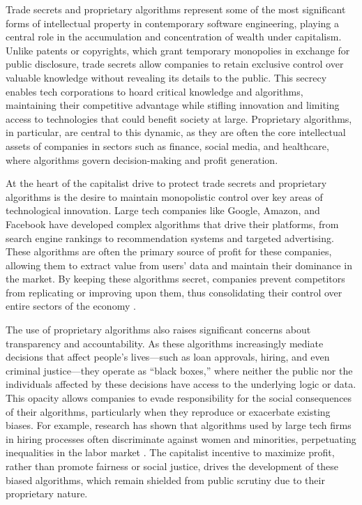 Trade secrets and proprietary algorithms represent some of the most significant forms of intellectual property in contemporary software engineering, playing a central role in the accumulation and concentration of wealth under capitalism. Unlike patents or copyrights, which grant temporary monopolies in exchange for public disclosure, trade secrets allow companies to retain exclusive control over valuable knowledge without revealing its details to the public. This secrecy enables tech corporations to hoard critical knowledge and algorithms, maintaining their competitive advantage while stifling innovation and limiting access to technologies that could benefit society at large. Proprietary algorithms, in particular, are central to this dynamic, as they are often the core intellectual assets of companies in sectors such as finance, social media, and healthcare, where algorithms govern decision-making and profit generation.

At the heart of the capitalist drive to protect trade secrets and proprietary algorithms is the desire to maintain monopolistic control over key areas of technological innovation. Large tech companies like Google, Amazon, and Facebook have developed complex algorithms that drive their platforms, from search engine rankings to recommendation systems and targeted advertising. These algorithms are often the primary source of profit for these companies, allowing them to extract value from users’ data and maintain their dominance in the market. By keeping these algorithms secret, companies prevent competitors from replicating or improving upon them, thus consolidating their control over entire sectors of the economy \cite[pp.~88-90]{pasquale2015}.

The use of proprietary algorithms also raises significant concerns about transparency and accountability. As these algorithms increasingly mediate decisions that affect people’s lives—such as loan approvals, hiring, and even criminal justice—they operate as “black boxes,” where neither the public nor the individuals affected by these decisions have access to the underlying logic or data. This opacity allows companies to evade responsibility for the social consequences of their algorithms, particularly when they reproduce or exacerbate existing biases. For example, research has shown that algorithms used by large tech firms in hiring processes often discriminate against women and minorities, perpetuating inequalities in the labor market \cite[pp.~123-126]{eubanks2018}. The capitalist incentive to maximize profit, rather than promote fairness or social justice, drives the development of these biased algorithms, which remain shielded from public scrutiny due to their proprietary nature.

